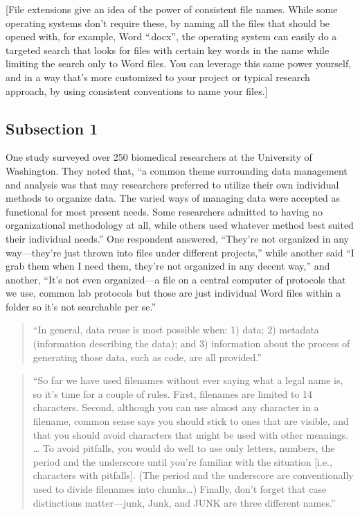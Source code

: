 \documentclass[]{tufte-book}
\begin{document}
{[}File extensions give an idea of the power of consistent file names. While some
operating systems don't require these, by naming all the files that should be
opened with, for example, Word ``.docx'', the operating system can easily do a
targeted search that looks for files with certain key words in the name while
limiting the search only to Word files. You can leverage this same power yourself,
and in a way that's more customized to your project or typical research approach,
by using consistent conventions to name your files.{]}

\hypertarget{subsection-1-2}{%
\subsection{Subsection 1}\label{subsection-1-2}}

One study surveyed over 250 biomedical researchers at the University of Washington.
They noted that, ``a common theme surrounding data management and analysis was that
may researchers preferred to utilize their own individual methods to organize data.
The varied ways of managing data were accepted as functional for most present needs.
Some researchers admitted to having no organizational methodology at all, while others
used whatever method best suited their individual needs.'' \citep{anderson2007issues}
One respondent answered, ``They're not organized in any way---they're just thrown into
files under different projects,'' while another said ``I grab them when I need them, they're
not organized in any decent way,'' and another, ``It's not even organized---a file on a central
computer of protocols that we use, common lab protocols but those are just individual
Word files within a folder so it's not searchable per se.'' \citep{anderson2007issues}

\begin{quote}
``In general, data reuse is most possible when: 1) data; 2) metadata (information
describing the data); and 3) information about the process of generating those data,
such as code, are all provided.'' \citep{goodman2014ten}
\end{quote}

\begin{quote}
``So far we have used filenames without ever saying what a legal name is, so it's time for a couple
of rules. First, filenames are limited to 14 characters. Second, although you can use almost any
character in a filename, common sense says you should stick to ones that are visible, and that you
should avoid characters that might be used with other meanings. \ldots{} To avoid pitfalls, you would
do well to use only letters, numbers, the period and the underscore until you're familiar with the
situation {[}i.e., characters with pitfalls{]}. (The period and the underscore are conventionally used
to divide filenames into chunks\ldots) Finally, don't forget that case distinctions matter---junk, Junk,
and JUNK are three different names.'' \citep{kernighan1984unix}
\end{quote}
\end{document}
